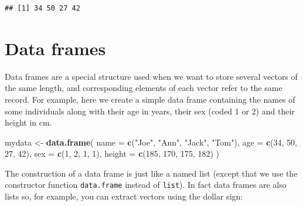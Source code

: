 \documentclass[
]{book}
\newenvironment{Shaded}{\begin{snugshade}}{\end{snugshade}}
\newcommand{\AttributeTok}[1]{\textcolor[rgb]{0.13,0.29,0.53}{#1}}
\newcommand{\DecValTok}[1]{\textcolor[rgb]{0.00,0.00,0.81}{#1}}
\newcommand{\FunctionTok}[1]{\textcolor[rgb]{0.13,0.29,0.53}{\textbf{#1}}}
\newcommand{\NormalTok}[1]{#1}
\newcommand{\OtherTok}[1]{\textcolor[rgb]{0.56,0.35,0.01}{#1}}
\newcommand{\SpecialCharTok}[1]{\textcolor[rgb]{0.81,0.36,0.00}{\textbf{#1}}}
\newcommand{\StringTok}[1]{\textcolor[rgb]{0.31,0.60,0.02}{#1}}
\begin{document}
\begin{Shaded}
\end{Shaded}

\begin{verbatim}
## [1] 34 50 27 42
\end{verbatim}

\section{Data frames}\label{data-frames}

Data frames are a special structure used when we want to store several vectors of the
same length, and corresponding elements of each vector refer to the same record.
For example, here we create a simple data frame containing the names of some individuals
along with their age in years, their sex (coded 1 or 2) and their height in cm.

\begin{Shaded}
\begin{Highlighting}[]
\NormalTok{mydata }\OtherTok{\textless{}{-}} \FunctionTok{data.frame}\NormalTok{(}
  \AttributeTok{name =} \FunctionTok{c}\NormalTok{(}\StringTok{"Joe"}\NormalTok{, }\StringTok{"Ann"}\NormalTok{, }\StringTok{"Jack"}\NormalTok{, }\StringTok{"Tom"}\NormalTok{),}
  \AttributeTok{age =} \FunctionTok{c}\NormalTok{(}\DecValTok{34}\NormalTok{, }\DecValTok{50}\NormalTok{, }\DecValTok{27}\NormalTok{, }\DecValTok{42}\NormalTok{), }\AttributeTok{sex =} \FunctionTok{c}\NormalTok{(}\DecValTok{1}\NormalTok{, }\DecValTok{2}\NormalTok{, }\DecValTok{1}\NormalTok{, }\DecValTok{1}\NormalTok{),}
  \AttributeTok{height =} \FunctionTok{c}\NormalTok{(}\DecValTok{185}\NormalTok{, }\DecValTok{170}\NormalTok{, }\DecValTok{175}\NormalTok{, }\DecValTok{182}\NormalTok{)}
\NormalTok{)}
\end{Highlighting}
\end{Shaded}

The construction of a data frame is just like a named list (except
that we use the constructor function \texttt{data.frame} instead of \texttt{list}). In fact data frames are also lists so, for example, you can
extract vectors using the dollar sign:

\begin{Shaded}
\end{Shaded}
\end{document}
